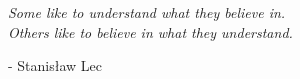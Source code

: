 \vspace*{0.2\textheight}
\renewcommand{\epigraphsize}{\large}
\setlength{\epigraphwidth}{0.8\textwidth}
\setlength{\epigraphrule}{0pt}

\epigraph{\textit{Some like to understand what they believe in. \\Others like to believe in what they understand.}}{- Stanisław Lec}




